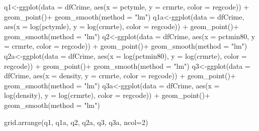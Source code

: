 \documentclass[]{article}
\newenvironment{Shaded}{}{}
\newcommand{\DataTypeTok}[1]{#1}
\newcommand{\DecValTok}[1]{#1}
\newcommand{\KeywordTok}[1]{\textcolor[rgb]{0.00,0.00,1.00}{#1}}
\newcommand{\NormalTok}[1]{#1}
\newcommand{\OperatorTok}[1]{#1}
\newcommand{\StringTok}[1]{\textcolor[rgb]{0.00,0.50,0.50}{#1}}
\begin{document}
\begin{Shaded}
\begin{Highlighting}[]
\NormalTok{q1<-}\KeywordTok{ggplot}\NormalTok{(}\DataTypeTok{data =}\NormalTok{ dfCrime, }\KeywordTok{aes}\NormalTok{(}\DataTypeTok{x =}\NormalTok{ pctymle, }\DataTypeTok{y =}\NormalTok{ crmrte, }\DataTypeTok{color =}\NormalTok{ regcode)) }\OperatorTok{+}
\StringTok{      }\KeywordTok{geom_point}\NormalTok{()}\OperatorTok{+}
\StringTok{  }\KeywordTok{geom_smooth}\NormalTok{(}\DataTypeTok{method =} \StringTok{"lm"}\NormalTok{)}
\NormalTok{q1a<-}\KeywordTok{ggplot}\NormalTok{(}\DataTypeTok{data =}\NormalTok{ dfCrime, }\KeywordTok{aes}\NormalTok{(}\DataTypeTok{x =} \KeywordTok{log}\NormalTok{(pctymle), }\DataTypeTok{y =} \KeywordTok{log}\NormalTok{(crmrte), }\DataTypeTok{color =}\NormalTok{ regcode)) }\OperatorTok{+}
\StringTok{      }\KeywordTok{geom_point}\NormalTok{()}\OperatorTok{+}
\StringTok{  }\KeywordTok{geom_smooth}\NormalTok{(}\DataTypeTok{method =} \StringTok{"lm"}\NormalTok{)}
\NormalTok{q2<-}\KeywordTok{ggplot}\NormalTok{(}\DataTypeTok{data =}\NormalTok{ dfCrime, }\KeywordTok{aes}\NormalTok{(}\DataTypeTok{x =}\NormalTok{ pctmin80, }\DataTypeTok{y =}\NormalTok{ crmrte, }\DataTypeTok{color =}\NormalTok{ regcode)) }\OperatorTok{+}
\StringTok{      }\KeywordTok{geom_point}\NormalTok{()}\OperatorTok{+}
\StringTok{  }\KeywordTok{geom_smooth}\NormalTok{(}\DataTypeTok{method =} \StringTok{"lm"}\NormalTok{)}
\NormalTok{q2a<-}\KeywordTok{ggplot}\NormalTok{(}\DataTypeTok{data =}\NormalTok{ dfCrime, }\KeywordTok{aes}\NormalTok{(}\DataTypeTok{x =} \KeywordTok{log}\NormalTok{(pctmin80), }\DataTypeTok{y =} \KeywordTok{log}\NormalTok{(crmrte), }\DataTypeTok{color =}\NormalTok{ regcode)) }\OperatorTok{+}
\StringTok{      }\KeywordTok{geom_point}\NormalTok{()}\OperatorTok{+}
\StringTok{  }\KeywordTok{geom_smooth}\NormalTok{(}\DataTypeTok{method =} \StringTok{"lm"}\NormalTok{)}
\NormalTok{q3<-}\KeywordTok{ggplot}\NormalTok{(}\DataTypeTok{data =}\NormalTok{ dfCrime, }\KeywordTok{aes}\NormalTok{(}\DataTypeTok{x =}\NormalTok{ density, }\DataTypeTok{y =}\NormalTok{ crmrte, }\DataTypeTok{color =}\NormalTok{ regcode)) }\OperatorTok{+}
\StringTok{      }\KeywordTok{geom_point}\NormalTok{()}\OperatorTok{+}
\StringTok{  }\KeywordTok{geom_smooth}\NormalTok{(}\DataTypeTok{method =} \StringTok{"lm"}\NormalTok{)}
\NormalTok{q3a<-}\KeywordTok{ggplot}\NormalTok{(}\DataTypeTok{data =}\NormalTok{ dfCrime, }\KeywordTok{aes}\NormalTok{(}\DataTypeTok{x =} \KeywordTok{log}\NormalTok{(density), }\DataTypeTok{y =} \KeywordTok{log}\NormalTok{(crmrte), }\DataTypeTok{color =}\NormalTok{ regcode)) }\OperatorTok{+}
\StringTok{      }\KeywordTok{geom_point}\NormalTok{()}\OperatorTok{+}
\StringTok{  }\KeywordTok{geom_smooth}\NormalTok{(}\DataTypeTok{method =} \StringTok{"lm"}\NormalTok{)}


\KeywordTok{grid.arrange}\NormalTok{(q1, q1a, q2, q2a, q3, q3a, }\DataTypeTok{ncol=}\DecValTok{2}\NormalTok{)}
\end{Highlighting}
\end{Shaded}
\end{document}
